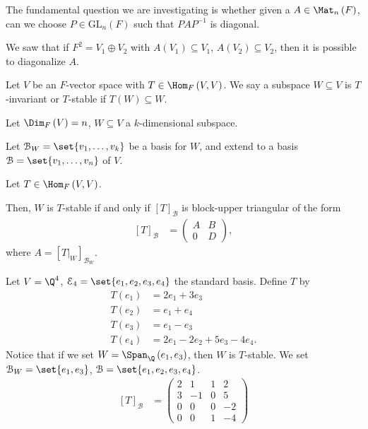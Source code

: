 \documentclass[10pt]{mypackage}
\begin{document}
\begin{recall}
  The fundamental question we are investigating is whether given a $A\in \Mat_{n}\left(F\right)$, can we choose $P\in \text{GL}_{n}\left(F\right)$ such that $PAP^{-1}$ is diagonal.\newline

  We saw that if $F^2 = V_1\oplus V_2$ with $A\left(V_1\right) \subseteq V_1$, $A\left(V_2\right)\subseteq V_2$, then it is possible to diagonalize $A$.
\end{recall}
\begin{definition}
  Let $V$ be an $F$-vector space with $T\in \Hom_{F}\left(V,V\right)$. We say a subspace $W\subseteq V$ is $T$-invariant or $T$-stable if $T\left(W\right)\subseteq W$.
\end{definition}
\begin{theorem}
  Let $\Dim_{F}\left(V\right) = n$, $W\subseteq V$ a $k$-dimensional subspace.\newline

Let $\mathcal{B}_{W} = \set{v_1,\dots,v_k}$ be a basis for $W$, and extend to a basis $\mathcal{B} = \set{v_1,\dots,v_n}$ of $V$.\newline

Let $T\in \Hom_{F}\left(V,V\right)$.\newline

Then, $W$ is $T$-stable if and only if $\left[T\right]_{\mathcal{B}}$ is block-upper triangular of the form
\begin{align*}
  \left[T\right]_{\mathcal{B}} &= \begin{pmatrix}A & B \\ 0 & D\end{pmatrix},
\end{align*}
where $A = \left[T\vert_{W}\right]_{\mathcal{B}_W}$.
\end{theorem}
\begin{example}
  Let $V = \Q^4$, $\mathcal{E}_4 = \set{e_1,e_2,e_3,e_4}$ the standard basis. Define $T$ by
  \begin{align*}
    T\left(e_1\right) &= 2e_1 + 3e_3\\
    T\left(e_2\right) &= e_1 + e_4\\
    T\left(e_3\right) &= e_1 - e_3\\
    T\left(e_4\right) &= 2e_1 - 2e_2 + 5e_3 - 4e_4.
  \end{align*}
  Notice that if we set $W = \Span_{\Q}\left(e_1,e_3\right)$, then $W$ is $T$-stable. We set $\mathcal{B}_W = \set{e_1,e_3}$, $\mathcal{B} = \set{e_1,e_2,e_3,e_4}$.
  \begin{align*}
    \left[T\right]_{\mathcal{B}} &= \begin{pmatrix}2 & 1 & 1 & 2 \\ 3 & -1 & 0 & 5 \\ 0 & 0 & 0 & -2 \\ 0 & 0 & 1 & -4\end{pmatrix}
  \end{align*}
\end{example}
\end{document}
